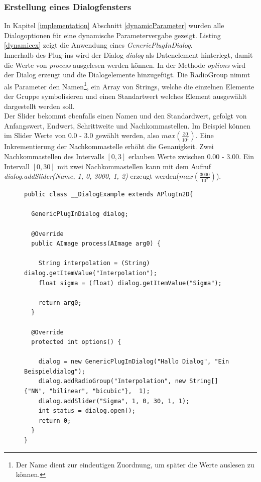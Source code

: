 \subsubsection{Erstellung eines Dialogfensters}
In Kapitel \ref{implementation} Abschnitt \ref{dynamicParameter} wurden alle Dialogoptionen für eine dynamische Parametervergabe gezeigt. Listing \ref{dynamicex} zeigt die Anwendung eines \textit{GenericPlugInDialog}.\\
Innerhalb des Plug-ins wird der Dialog \textit{dialog} als Datenelement hinterlegt, damit die Werte von \textit{process} ausgelesen werden können. In der Methode \textit{options} wird der Dialog erzeugt und die Dialogelemente hinzugefügt. Die RadioGroup nimmt als Parameter den Namen\footnote{Der Name dient zur eindeutigen Zuordnung, um später die Werte auslesen zu können.}, ein Array von Strings, welche die einzelnen Elemente der Gruppe symbolisieren und einen Standartwert welches Element ausgewählt dargestellt werden soll.\\
Der Slider bekommt ebenfalls einen Namen und den Standardwert, gefolgt von Anfangswert, Endwert, Schrittweite und Nachkommastellen. Im Beispiel können im Slider Werte von $0.0$ - $3.0$ gewählt werden, also $max(\frac{30}{10^1})$. Eine Inkrementierung der Nachkommastelle erhöht die Genauigkeit. Zwei Nachkommastellen des Intervalls $[0,3]$ erlauben Werte zwischen $0.00$ - $3.00$. Ein Intervall $[0,30]$ mit zwei Nachkommastellen kann mit dem Aufruf \textit{dialog.addSlider(\glqq Name\grqq, 1, 0, 3000, 1, 2)} erzeugt werden($max(\frac{3000}{10^2})$).

\begin{figure}[htbp]
\begin{lstlisting}[frame=leftline]
public class __DialogExample extends APlugIn2D{

  GenericPlugInDialog dialog;
	
  @Override
  public AImage process(AImage arg0) {

    String interpolation = (String) dialog.getItemValue("Interpolation");
    float sigma = (float) dialog.getItemValue("Sigma");
	    
    return arg0;	
  }
 
  @Override
  protected int options() {
		
    dialog = new GenericPlugInDialog("Hallo Dialog", "Ein Beispieldialog");	
    dialog.addRadioGroup("Interpolation", new String[]{"NN", "bilinear", "bicubic"},  1);
    dialog.addSlider("Sigma", 1, 0, 30, 1, 1);
    int status = dialog.open();	
    return 0;
  }
}
\end{lstlisting}
\end{figure}

